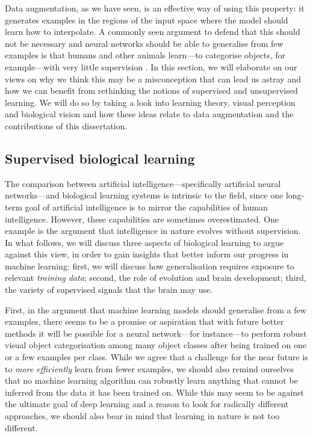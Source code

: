 {Data augmentation, as we have seen, is an effective way of using this property: it generates examples in the regions of the input space where the model should learn how to interpolate. A commonly seen argument to defend that this should not be necessary and neural networks should be able to generalise from few examples is that humans and other animals learn---to categorise objects, for example---with very little supervision \citep{vinyals2016oneshot, marcus2018critiquedl, morgenstern2019oneshot, zador2019purelearning}. In this section, we will elaborate on our views on why we think this may be a misconception that can lead us astray and how we can benefit from rethinking the notions of supervised and unsupervised learning. We will do so by taking a look into learning theory, visual perception and biological vision and how these ideas relate to data augmentation and the contributions of this dissertation.

\subsection{Supervised biological learning}
The comparison between artificial intelligence---specifically artificial neural networks---and biological learning systems is intrinsic to the field, since one long-term goal of artificial intelligence is to mirror the capabilities of human intelligence. However, these capabilities are sometimes overestimated. One example is the argument that intelligence in nature evolves without supervision. In what follows, we will discuss three aspects of biological learning to argue against this view, in order to gain insights that better inform our progress in machine learning: first, we will discuss how generalisation requires exposure to relevant \textit{training data}; second, the role of evolution and brain development; third, the variety of supervised signals that the brain may use. 

First, in the argument that machine learning models should generalise from a few examples, there seems to be a promise or aspiration that with future better methods it will be possible for a neural network---for instance---to perform robust visual object categorisation among many object classes after being trained on one or a few examples per class. While we agree that a challenge for the near future is to \textit{more efficiently} learn from fewer examples, we should also remind ourselves that no machine learning algorithm can robustly learn anything that cannot be inferred from the data it has been trained on. While this may seem to be against the ultimate goal of deep learning and a reason to look for radically different approaches, we should also bear in mind that learning in nature is not too different. 

}
